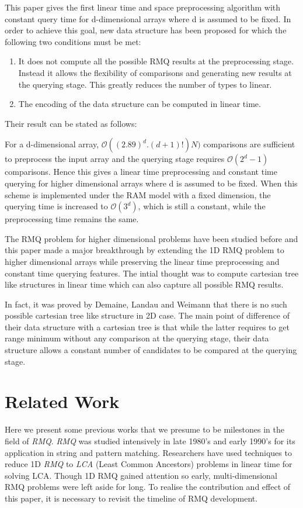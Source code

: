 This paper gives the first linear time and space preprocessing algorithm with constant query time for d-dimensional arrays where d is assumed to be fixed. In order to achieve this goal, new data structure has been proposed for which the following two conditions must be met:\par
\begin{enumerate}
\item It does not compute all the possible RMQ results at the preprocessing stage. Instead it allows the flexibility of comparisons and generating new results at the querying stage. This greatly reduces the number of types to linear.\par
\item The encoding of the data structure can be computed in linear time.
\end{enumerate}
Their result can be stated as follows:\par
For a d-dimensional array, $\mathcal{O}((2.89)^d.(d+1)!)N)$ comparisons are sufficient to preprocess the input array and the querying stage requires $\mathcal{O}(2^d-1)$ comparisons. Hence this gives a linear time preprocessing and constant time querying for higher dimensional arrays where d is assumed to be fixed. When this scheme is implemented under the RAM model with a fixed dimension, the querying time is increased to $\mathcal{O}(3^d)$, which is still a constant, while the preprocessing time remains the same.\par
The RMQ problem for higher dimensional problems have been studied before and this paper made a major breakthrough by extending the 1D RMQ problem to higher dimensional arrays while preserving the linear time preprocessing and constant time querying features. The intial thought was to compute cartesian tree like structures in linear time which can also capture all possible RMQ results.\par
In fact, it was proved by Demaine, Landau and Weimann\cite{p2} that there is no such possible cartesian tree like structure in 2D case. The main point of difference of their data structure with a cartesian tree is that while the latter requires to get range minimum without any comparison at the querying stage, their data structure allows a constant number of candidates to be compared at the querying stage. 
\section{Related Work}
Here we present some previous works that we presume to be milestones in the field of \emph{RMQ}. \emph{RMQ} was studied intensively in late 1980's and early 1990's for its application in string and pattern matching. Researchers have used techniques to reduce 1D \emph{RMQ} to \emph{LCA} (Least Common Ancestors) problems in linear time for solving LCA. Though 1D RMQ gained attention so early, multi-dimensional RMQ problems were left aside for long.
To realise the contribution and effect of this paper, it is necessary to revisit the timeline of RMQ development. \\

